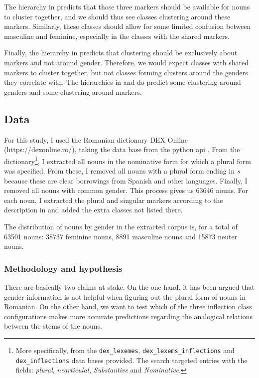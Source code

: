 The hierarchy in  predicts that those three markers should be available for nouns to cluster together, and we should thus see classes clustering around these markers. Similarly, these classes should allow for some limited confusion between masculine and feminine, especially in the classes with the shared markers.

Finally, the hierarchy in  predicts that clustering should be exclusively about markers and not around gender. Therefore, we would expect classes with shared markers to cluster together, but not classes forming clusters around the genders they correlate with. The hierarchies in  and  do predict some clustering around genders and some clustering around markers.

\subsection{Data}

For this study, I used the Romanian dictionary DEX Online (https://dexonline.ro/), taking the data base from the python api \autocite{Navalici.2013}. From the dictionary\footnote{More specifically, from the \texttt{dex\_lexemes}, \texttt{dex\_lexems\_inflections} and \texttt{dex\_inflections} data bases provided. The search targeted entries with the fields: \textit{plural}, \textit{nearticulat}, \textit{Substantive} and \textit{Nominative}.}, I extracted all nouns in the nominative form for which a plural form was specified. From these, I removed all nouns with a plural form ending in \textit{s} because these are clear borrowings from Spanish and other languages. Finally, I removed all nouns with common gender. This process gives us 63646 nouns. For each noun, I extracted the plural and singular markers according to the description in \textcite{Cojocaru.2003} and added the extra classes not listed there.

The distribution of nouns by gender in the extracted corpus is, for a total of 63501 nouns: 38737 feminine nouns, 8891 masculine nouns and 15873 neuter nouns.

\subsubsection{Methodology and hypothesis}

There are basically two claims at stake. On the one hand, it has been argued that gender information is not helpful when figuring out the plural form of nouns in Romanian. On the other hand, we want to test which of the three inflection class configurations makes more accurate predictions regarding the analogical relations between the stems of the nouns.

